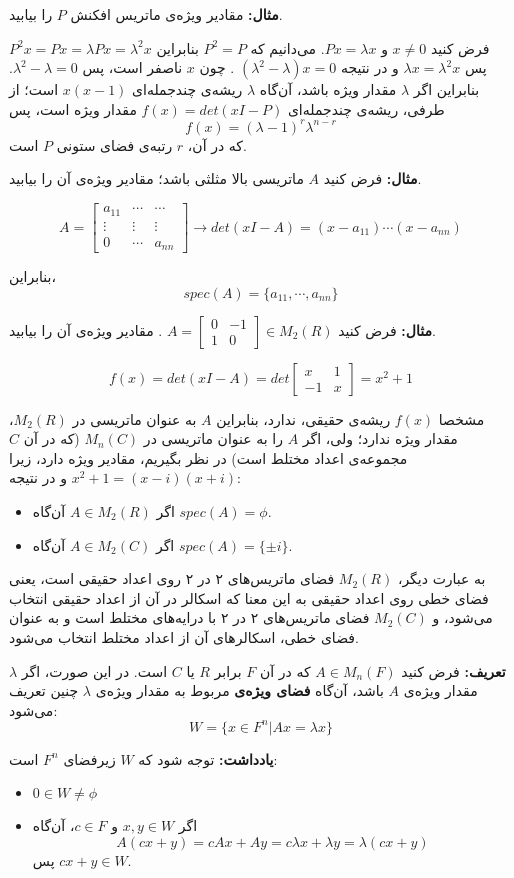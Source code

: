 \textbf{مثال:}
مقادیر ویژه‌ی ماتریس افکنش $P$ را بیابید.

فرض کنید $x \neq 0$ و $Px=\lambda x$. می‌دانیم که $P^2=P$ بنابراین
$P^2 x = Px = \lambda P x = \lambda^2 x $
پس
$\lambda x = \lambda^2 x$
و در نتیجه
$(\lambda^2 - \lambda)x=0$
. چون $x$ ناصفر است، پس
$\lambda^2 - \lambda=0$.
بنابراین اگر $\lambda$ مقدار ویژه باشد، آن‌گاه $\lambda$ ریشه‌ی چندجمله‌ای $x(x-1)$ است؛ از طرفی، ریشه‌ی چندجمله‌ای
$f(x)=det(xI-P)$
مقدار ویژه است، پس
$$f(x) = (\lambda-1)^r \lambda^{n-r} $$
که در آن، $r$ رتبه‌ی فضای ستونی $P$ است.

\textbf{مثال:}
فرض کنید $A$ ماتریسی بالا مثلثی باشد؛ مقادیر ویژه‌ی آن را بیابید.

$$A=\begin{bmatrix}
a_{11} & \cdots & \cdots \\
\vdots & \vdots & \vdots \\
0 & \cdots & a_{nn}
\end{bmatrix} \to det(xI-A) = (x-a_{11}) \cdots (x-a_{nn}) $$

بنابراین،
$$ spec(A) = \{a_{11},\cdots,a_{nn}\} $$

\textbf{مثال:}
فرض کنید
$A=\begin{bmatrix}
0 & -1 \\
1 & 0
\end{bmatrix} \in M_2(R) $
. مقادیر ویژه‌ی آن را بیابید.

$$f(x) = det(xI-A) = det \begin{bmatrix}
x & 1 \\
-1 & x
\end{bmatrix} = x^2+1 $$

مشخصا $f(x)$ ریشه‌ی حقیقی، ندارد، بنابراین $A$ به عنوان ماتریسی در 
$M_2(R)$،
مقدار ویژه ندارد؛ ولی، اگر $A$ را به عنوان ماتریسی در
$M_n(C)$
(که در آن $C$ مجموعه‌ی اعداد مختلط است) در نظر بگیریم، مقادیر ویژه دارد، زیرا
$x^2+1 = (x-i)(x+i)$ 
و در نتیجه:
\begin{itemize}
	\item
	اگر $A \in M_2(R)$ آن‌گاه $spec(A)=\phi$.
	\item
		اگر $A \in M_2(C)$ آن‌گاه $spec(A)=\{\pm i\}$.
\end{itemize}

به عبارت دیگر، $M_2(R)$ فضای ماتریس‌های ۲ در ۲ روی اعداد حقیقی است، یعنی فضای خطی روی اعداد حقیقی به این معنا که اسکالر در آن از اعداد حقیقی انتخاب می‌شود، و $M_2(C)$ فضای  ماتریس‌های ۲ در ۲ با درایه‌های مختلط است و به عنوان فضای خطی، اسکالرهای آن از اعداد مختلط انتخاب می‌شود.

\textbf{تعریف:}
فرض کنید
$A \in M_n(F)$
که در آن $F$ برابر $R$ یا $C$ است. در این صورت، اگر $\lambda$ مقدار ویژه‌ی $A$ باشد، آن‌گاه \textbf{فضای ویژه‌ی} مربوط به مقدار ویژه‌ی $\lambda$ چنین تعریف می‌شود:
$$W = \{x \in F^n | Ax=\lambda x\} $$

\textbf{یادداشت:}
توجه شود که $W$ زیرفضای $F^n$ است:
\begin{itemize}
	\item 
	$0 \in W \neq \phi $
	\item 
	اگر
	$x,y\in W$
	و $c\in F$، آن‌گاه
	$$A(cx+y) = cAx+Ay = c \lambda x + \lambda y = \lambda(cx+y) $$
	پس $cx+y\in W$.
\end{itemize}








